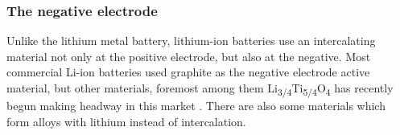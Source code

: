 \documentclass[12pt]{article} %
\begin{document}

\subsubsection{The negative electrode} %

Unlike the lithium metal battery, lithium-ion batteries use an intercalating material not only at the positive electrode, but also at the negative.
Most commercial Li-ion batteries used graphite as the negative electrode active material, but other materials, foremost among them Li\textsubscript{3/4}Ti\textsubscript{5/4}O\textsubscript{4} has recently begun making headway in this market \cite{kulova_new_2013}.
There are also some materials which form alloys with lithium instead of intercalation.
\end{document}
